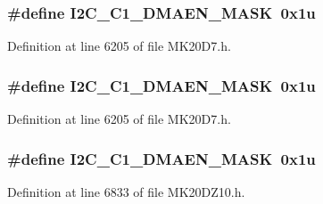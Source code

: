 \subsubsection[{\texorpdfstring{I2\+C\+\_\+\+C1\+\_\+\+D\+M\+A\+E\+N\+\_\+\+M\+A\+SK}{I2C_C1_DMAEN_MASK}}]{\setlength{\rightskip}{0pt plus 5cm}\#define I2\+C\+\_\+\+C1\+\_\+\+D\+M\+A\+E\+N\+\_\+\+M\+A\+SK~0x1u}\hypertarget{group___i2_c___register___masks_gadfd8fccdd35a4944a1e53ffa26e5d06b}{}\label{group___i2_c___register___masks_gadfd8fccdd35a4944a1e53ffa26e5d06b}


Definition at line 6205 of file M\+K20\+D7.\+h.

\subsubsection[{\texorpdfstring{I2\+C\+\_\+\+C1\+\_\+\+D\+M\+A\+E\+N\+\_\+\+M\+A\+SK}{I2C_C1_DMAEN_MASK}}]{\setlength{\rightskip}{0pt plus 5cm}\#define I2\+C\+\_\+\+C1\+\_\+\+D\+M\+A\+E\+N\+\_\+\+M\+A\+SK~0x1u}\hypertarget{group___i2_c___register___masks_gadfd8fccdd35a4944a1e53ffa26e5d06b}{}\label{group___i2_c___register___masks_gadfd8fccdd35a4944a1e53ffa26e5d06b}


Definition at line 6205 of file M\+K20\+D7.\+h.

\subsubsection[{\texorpdfstring{I2\+C\+\_\+\+C1\+\_\+\+D\+M\+A\+E\+N\+\_\+\+M\+A\+SK}{I2C_C1_DMAEN_MASK}}]{\setlength{\rightskip}{0pt plus 5cm}\#define I2\+C\+\_\+\+C1\+\_\+\+D\+M\+A\+E\+N\+\_\+\+M\+A\+SK~0x1u}\hypertarget{group___i2_c___register___masks_gadfd8fccdd35a4944a1e53ffa26e5d06b}{}\label{group___i2_c___register___masks_gadfd8fccdd35a4944a1e53ffa26e5d06b}


Definition at line 6833 of file M\+K20\+D\+Z10.\+h.

